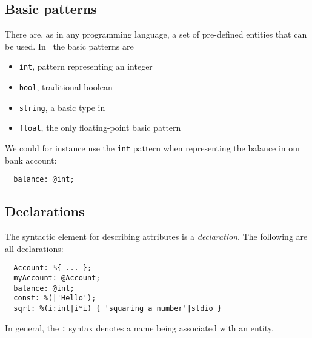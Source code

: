 \subsection*{Basic patterns}
There are, as in any programming language, a set of pre-defined
entities that can be used. In \gbeta\ the basic patterns are
\begin{itemize}\setlength{\itemsep}{-2pt}
  \item \texttt{int}, pattern representing an integer
  \item \texttt{bool}, traditional boolean
  \item \texttt{string}, a basic type in \gbeta
  \item \texttt{float}, the only floating-point basic pattern
\end{itemize}

We could for instance use the \texttt{int} pattern when representing
the balance in our bank account:
\begin{verbatim}
  balance: @int;
\end{verbatim}

\subsection*{Declarations}
The syntactic element for describing attributes is a
\emph{declaration}. The following are all declarations:
\begin{verbatim}
  Account: %{ ... };
  myAccount: @Account;
  balance: @int;
  const: %(|'Hello');
  sqrt: %(i:int|i*i) { 'squaring a number'|stdio }
\end{verbatim}
In general, the \verb|:| syntax denotes a name being associated with
an entity.

